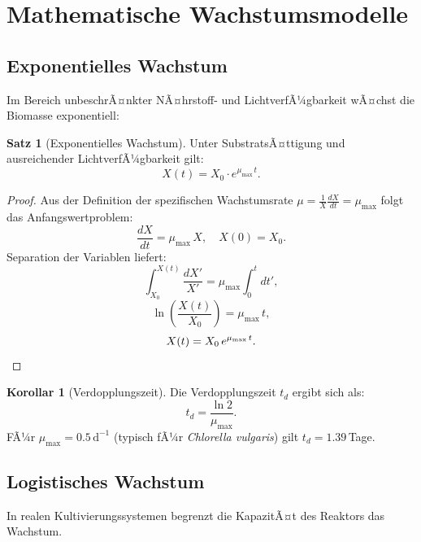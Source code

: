 ﻿\documentclass[a4paper,12pt]{article}
\theoremstyle{definition}
\newtheorem{satz}{Satz}
\newtheorem{korollar}{Korollar}
\begin{document}
\section{Mathematische Wachstumsmodelle}

\subsection{Exponentielles Wachstum}

Im Bereich unbeschrÃ¤nkter NÃ¤hrstoff- und LichtverfÃ¼gbarkeit wÃ¤chst die Biomasse exponentiell:

\begin{satz}[Exponentielles Wachstum]
	Unter SubstratsÃ¤ttigung und ausreichender LichtverfÃ¼gbarkeit gilt:
	\[
		X(t) = X_0 \cdot e^{\mu_\mathrm{max}\,t}.
	\]
\end{satz}

\begin{proof}
	Aus der Definition der spezifischen Wachstumsrate $\mu = \frac{1}{X}\frac{dX}{dt} = \mu_\mathrm{max}$
	folgt das Anfangswertproblem:
	\[
		\frac{dX}{dt} = \mu_\mathrm{max}\,X, \quad X(0) = X_0.
	\]
	Separation der Variablen liefert:
	\[
		\int_{X_0}^{X(t)} \frac{dX'}{X'} = \mu_\mathrm{max} \int_0^t dt',
	\]
	\[
		\ln\!\left(\frac{X(t)}{X_0}\right) = \mu_\mathrm{max}\,t,
	\]
	\[
		X(t) = X_0\,e^{\mu_\mathrm{max}\,t}. \qedhere
	\]
\end{proof}

\begin{korollar}[Verdopplungszeit]
	Die Verdopplungszeit $t_d$ ergibt sich als:
	\[
		t_d = \frac{\ln 2}{\mu_\mathrm{max}}.
	\]
	FÃ¼r $\mu_\mathrm{max} = 0.5\,\mathrm{d}^{-1}$ (typisch fÃ¼r \textit{Chlorella vulgaris}) gilt
	$t_d = 1.39$\,Tage.
\end{korollar}

\subsection{Logistisches Wachstum}

In realen Kultivierungssystemen begrenzt die KapazitÃ¤t des Reaktors das Wachstum.
\end{document}
